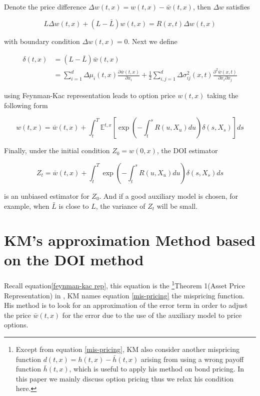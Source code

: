 Denote the price difference $\Delta w(t,x) = w(t,x) - \bar{w}(t,x)$, then $\Delta w$ satisfies 

\begin{equation}
    L \Delta w(t, x)+ (L-\bar{L}) w(t,x)=R(x, t) \Delta w(t, x)
\end{equation}

\noindent with boundary condition $\Delta w(t,x) = 0$. Next we define

\begin{equation}\label{mis-pricing}
    \begin{aligned}
        \delta(t,x) &= (L-\bar{L}) \bar{w}(t,x) \\
        &=\sum_{i=1}^{d} \Delta \mu_{i}(t,x) \frac{\partial \bar{w}(t,x)}{\partial x_{i}}+\frac{1}{2} \sum_{i, j=1}^{d} \Delta \sigma_{i j}^{2}(x, t) \frac{\partial^{2} \bar{w}(x,t)}{\partial x_{i} \partial x_{j}}
    \end{aligned}
\end{equation}

\noindent using Feynman-Kac representation leads to option price $w(t,x)$ taking the following form

\begin{equation}\label{feynman-kac rep}
        w(t, x)=\bar{w}(t,x)+\int_{t}^{T} \mathbb{E}^{t,x}\left[\exp \left(-\int_{t}^{s} R(u, X_u) d u\right) \delta(s,X_s)\right] d s
\end{equation}

\noindent Finally, under the initial condition $Z_0 = w(0,x)$, the DOI estimator

\begin{equation}
        Z_t =\bar{w}(t, x)+\int_{t}^{T} \exp \left(-\int_{t}^{s} R(u, X_u) d u\right) \delta(s,X_s)d s
\end{equation}

\noindent is an unbiased estimator for $Z_0$. And if a good auxiliary model is chosen, for example, when $\bar{L}$ is close to $L$, the variance of $Z_t$ will be small.

\section{KM's approximation Method based on the DOI method}
\label{sec: 2.2}

Recall equation\eqref{feynman-kac rep}, this equation is the \footnote{Except from equation \eqref{mis-pricing}, KM also consider another mispricing function $d(t,x)=h(t,x)-\bar{h}(t,x)$ arising from using a wrong payoff function $\bar{h}(t,x)$, which is useful to apply his method on bond pricing. In this paper we mainly discuss option pricing thus we relax his condition here.}{Theorem 1(Asset Price Representation)} in \cite{kristensen_adding_2011}, KM names equation \eqref{mis-pricing} the mispricing function. His method is to look for an approximation of the error term in order to adjust the price $\bar{w}(t,x)$ for the error due to the use of the auxiliary model to price options.

